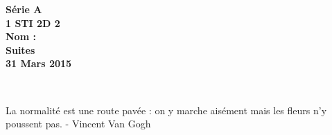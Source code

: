\documentclass[12pt]{article}
\begin{document}

\begin{minipage}[t]{\textwidth}
  \raggedright
      {\bfseries Série A}\\[.35ex]
      {\bfseries 1 STI 2D 2}\\[.35ex]
      {\bfseries Nom : }\\[.35ex]
      \vspace*{-1cm}
      \raggedleft
          {\bfseries Suites}\\[.35ex]
          {\bfseries 31 Mars 2015}\\[.35ex]
\end{minipage}\\[1em]

\begin{center}
  \textsf{La normalité est une route pavée : on y marche aisément mais les fleurs n'y poussent pas. - Vincent Van Gogh}\\
\end{center}

\setlength{\columnseprule}{1pt}
\end{document}
